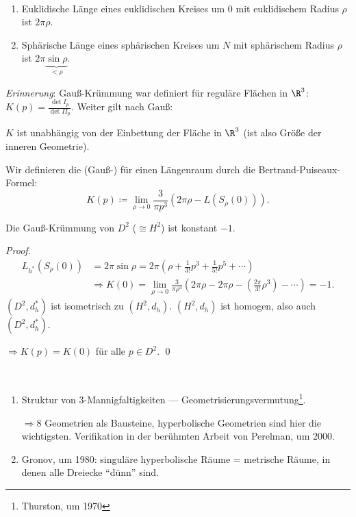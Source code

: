 \begin{remark}
  \
  \begin{enumerate}
    \item Euklidische Länge eines euklidischen Kreises um \( 0 \) mit euklidischem Radius \( \rho \) ist \( 2\pi\rho \).
    \item Sphärische Länge eines sphärischen Kreises um \( N \) mit sphärischem Radius \( \rho \) ist \( 2\pi\underbrace{\sin \rho}_{< \rho} \).
  \end{enumerate}
  \emph{Erinnerung}: Gauß-Krümmung war definiert für reguläre Flächen in \( \R^3 \): \( K(p) = \frac{\det I_p}{\det II_p} \). Weiter gilt nach Gauß:

  \( K \) ist unabhängig von der Einbettung der Fläche in \( \R^3 \) (ist also Größe der inneren Geometrie).
\end{remark}

\begin{definition}[Krümmung]
  Wir definieren die (Gauß-) für einen Längenraum durch die Bertrand-Puiseaux-Formel:
  \begin{equation*}
    K(p) \coloneqq \lim_{\rho \to 0} \frac{3}{\pi p^3}\left( 2\pi\rho - L\left( S_\rho(0) \right) \right)\text{.}
  \end{equation*}
\end{definition}

\begin{theorem}
  Die Gauß-Krümmung von \( D^2 \) (\( \cong H^2 \)) ist konstant \( -1 \).

  \begin{proof}
    \
    \begin{align*}
      L_{h^\ast}(S_\rho(0)) &= 2\pi\sin\rho = 2\pi\left( \rho + \frac{1}{3!}p^3 + \frac{1}{5!}p^5 + \cdots \right) \\
       &\Rightarrow K(0) = \lim_{\rho \to 0} \frac{3}{\pi \rho^3}\left( 2\pi\rho - 2\pi\rho - \left( \frac{2\pi}{3!}\rho^3 \right) - \cdots \right) = -1\text{.}
    \end{align*}
    \( (D^2, d_h^\ast) \) ist isometrisch zu \( (H^2, d_h) \). \( (H^2, d_h) \) ist homogen, also auch \( (D^2, d_h^\ast) \).

    \( \Rightarrow K(p) = K(0) \) für alle \( p \in D^2 \). \qed{}
  \end{proof}
\end{theorem}

\begin{remark}
  \
  \begin{enumerate}
    \item Struktur von \( 3 \)-Mannigfaltigkeiten --- Geometrisierungsvermutung\footnote{Thurston, um 1970}.

      \( \Rightarrow 8 \) Geometrien als Bausteine, hyperbolische Geometrien sind hier die wichtigsten. Verifikation in der berühmten Arbeit von Perelman, um 2000.

    \item Gronov, um 1980: singuläre hyperbolische Räume = metrische Räume, in denen alle Dreiecke ``dünn'' sind.
  \end{enumerate}
\end{remark}